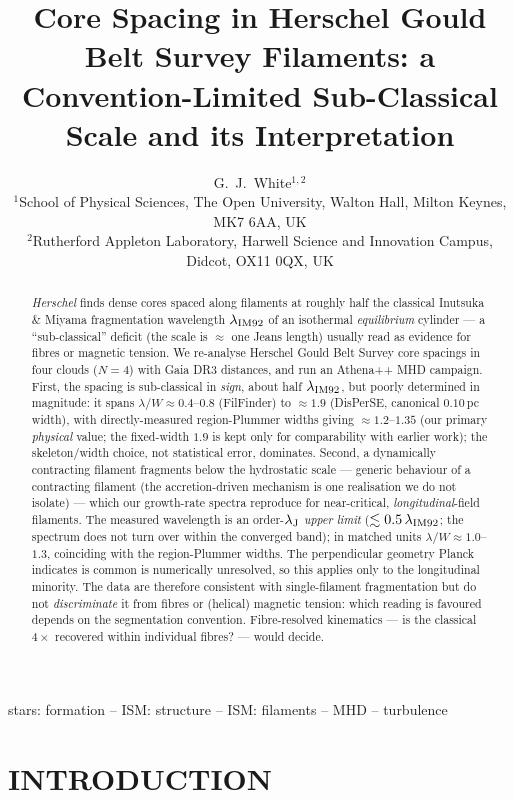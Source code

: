 \documentclass[usenatbib,twoside,twocolumn]{mnras}
\title{Core Spacing in Herschel Gould Belt Survey Filaments: a Convention-Limited Sub-Classical Scale and its Interpretation}
\author[G.~J.~White]{G.~J.~White$^{1,2}$\\
$^{1}$School of Physical Sciences, The Open University, Walton Hall, Milton Keynes, MK7 6AA, UK\\
$^{2}$Rutherford Appleton Laboratory, Harwell Science and Innovation Campus, Didcot, OX11 0QX, UK}
\begin{document}
\maketitle

\begin{abstract}
\textit{Herschel} finds dense cores spaced along filaments at roughly half the classical Inutsuka \& Miyama fragmentation wavelength $\lambda_{\rm IM92}$ of an isothermal \emph{equilibrium} cylinder --- a ``sub-classical'' deficit (the scale is $\approx$ one Jeans length) usually read as evidence for fibres or magnetic tension. We re-analyse Herschel Gould Belt Survey core spacings in four clouds ($N=4$) with Gaia DR3 distances, and run an Athena++ MHD campaign. First, the spacing is sub-classical in \emph{sign}, about half $\lambda_{\rm IM92}$, but poorly determined in magnitude: it spans $\lambda/W\approx0.4$--$0.8$ (FilFinder) to $\approx1.9$ (DisPerSE, canonical $0.10$\,pc width), with directly-measured region-Plummer widths giving $\approx1.2$--$1.35$ (our primary \emph{physical} value; the fixed-width $1.9$ is kept only for comparability with earlier work); the skeleton/width choice, not statistical error, dominates. Second, a dynamically contracting filament fragments below the hydrostatic scale --- generic behaviour of a contracting filament (the accretion-driven \citealt{Clarke2016,Clarke2017} mechanism is one realisation we do not isolate) --- which our growth-rate spectra reproduce for near-critical, \emph{longitudinal}-field filaments. The measured wavelength is an order-$\lambda_{\rm J}$ \emph{upper limit} ($\lesssim0.5\,\lambda_{\rm IM92}$; the spectrum does not turn over within the converged band); in matched units $\lambda/W\approx1.0$--$1.3$, coinciding with the region-Plummer widths. The perpendicular geometry Planck indicates is common is numerically unresolved, so this applies only to the longitudinal minority. The data are therefore consistent with single-filament fragmentation but do not \emph{discriminate} it from fibres or (helical) magnetic tension: which reading is favoured depends on the segmentation convention. Fibre-resolved kinematics --- is the classical $4\times$ recovered within individual fibres? --- would decide.
\end{abstract}


\begin{keywords}
stars: formation -- ISM: structure -- ISM: filaments -- MHD -- turbulence
\end{keywords}

\section{INTRODUCTION}
\end{document}
